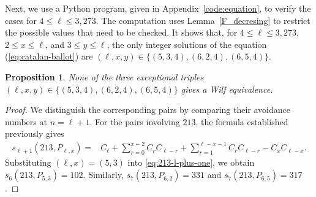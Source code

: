 \documentclass[11pt]{article}
\newtheorem{prop}[thm]{Proposition}
\begin{document}
Next, we use a Python program, given in Appendix~\ref{code:equation}, to verify the cases for
$4\leq\ell\leq3{,}273$. The computation uses Lemma~\ref{F_decresing}
to restrict the possible values that need to be checked. It shows that,
for $4\leq\ell\leq3{,}273$, $2\leq x\leq\ell$, and
$3\leq y\leq\ell$, the only integer solutions of the equation (\ref{eq:catalan-ballot}) are $(\ell,x,y)\in\{(5,3,4), (6,2,4),(6,5,4)\}$.

\begin{prop}\label{lem:exceptional-triples}
None of the three exceptional triples $(\ell,x,y)\in\{(5,3,4),(6,2,4),(6,5,4)\}$
gives a Wilf equivalence.
\end{prop}

\begin{proof}
We distinguish the corresponding pairs by comparing their avoidance
numbers at $n=\ell+1$.
For the pairs involving $213$, the formula established previously gives
\begin{align}
s_{\ell+1}(213,P_{\ell,x})
={}&
C_\ell
+\sum_{r=0}^{x-2}C_rC_{\ell-r}
+\sum_{r=1}^{\ell-x-1}C_rC_{\ell-r}
-C_xC_{\ell-x}.
\label{eq:213-l-plus-one}
\end{align}
Substituting $(\ell,x)=(5,3)$ into
\eqref{eq:213-l-plus-one}, we obtain
$s_6(213,P_{5,3})=102$.
Similarly,
$s_7(213,P_{6,2})=331$ and 
$s_7(213,P_{6,5})=317$.


\end{proof}
\end{document}

